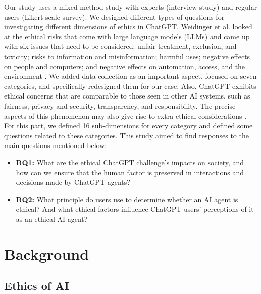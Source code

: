 \documentclass[sigconf]{acmart}
\begin{document}
Our study uses a mixed-method study with experts (interview study) and regular users (Likert scale survey). We designed different types of questions for investigating different dimensions of ethics in ChatGPT. Weidinger et al. looked at the ethical risks that come with large language models (LLMs) and came up with six issues that need to be considered: unfair treatment, exclusion, and toxicity; risks to information and misinformation; harmful uses; negative effects on people and computers; and negative effects on automation, access, and the environment \cite{weidinger2021ethical}. We added data collection as an important aspect, focused on seven categories, and specifically redesigned them for our case. Also, ChatGPT exhibits ethical concerns that are comparable to those seen in other AI systems, such as fairness, privacy and security, transparency, and responsibility. The precise aspects of this phenomenon may also give rise to extra ethical considerations \cite{Zhuo2023Exploring}. For this part, we defined 16 sub-dimensions for every category and defined some questions related to these categories. This study aimed to find responses to the main questions mentioned below:

\begin{itemize}

    \item \textbf{RQ1:} What are the ethical ChatGPT challenge's impacts on society, and how can we ensure that the human factor is preserved in interactions and decisions made by ChatGPT agents?

    
    \item \textbf{RQ2:} What principle do users use to determine whether an AI agent is ethical? And what ethical factors influence ChatGPT users' perceptions of it as an ethical AI agent? 

\end{itemize}





\section{Background}




\subsection{Ethics of AI}
\end{document}
